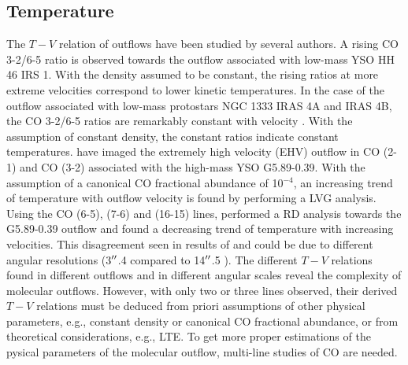 \subsection{Temperature}

The $T-V$ relation of outflows have been studied by several authors.  A rising CO 3-2/6-5 ratio is observed towards the outflow associated with low-mass YSO HH 46 IRS 1\citep{2009A&A...501..633V}. With the density assumed to be constant, the rising ratios at more extreme velocities correspond to lower kinetic temperatures. In the case of the outflow associated with low-mass protostars NGC 1333 IRAS 4A and  IRAS 4B, the CO 3-2/6-5 ratios are remarkably constant with velocity \citep{2012A&A...542A..86Y}. With the assumption of constant density, the constant ratios indicate constant temperatures. \citet{2012ApJ...744L..26S} have imaged the extremely high velocity (EHV) outflow in CO (2-1) and CO (3-2) associated with the high-mass YSO G5.89-0.39. With the assumption of a canonical CO fractional abundance of 10$^{-4}$, an increasing trend of temperature with outflow velocity is found by performing a LVG analysis. Using the CO (6-5), (7-6) and (16-15) lines, \citet{2015A&A...584A..70L} performed a RD analysis towards the G5.89-0.39 outflow and found a decreasing trend of temperature with increasing velocities. This disagreement seen in results of \citet{2012ApJ...744L..26S} and \citet{2015A&A...584A..70L} could be due to different angular resolutions (3${\mbox{$^{\prime\prime}$}}$.4 compared to 14${\mbox{$^{\prime\prime}$}}$.5 ). The different $T-V$ relations found in different outflows and in different angular scales reveal the complexity of molecular outflows. However, with only two or three lines observed, their derived $T-V$ relations must be deduced from priori assumptions of other physical parameters, e.g., constant density or canonical CO fractional abundance, or from theoretical considerations, e.g., LTE. To get more proper estimations of the pysical parameters of the molecular outflow, multi-line studies of CO are needed.

